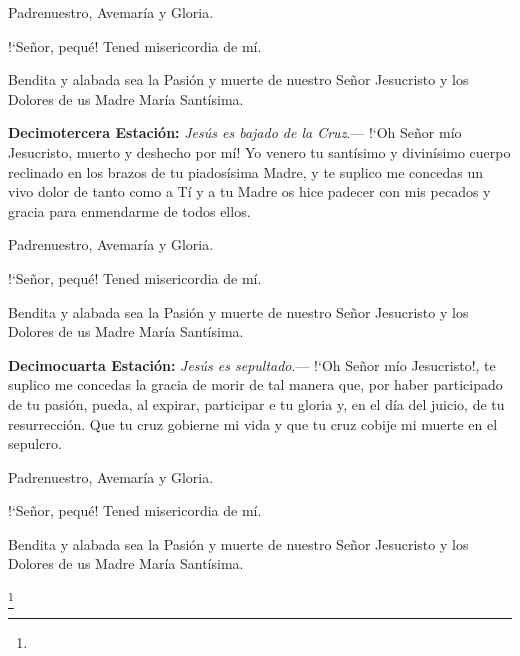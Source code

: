 \vspace{2mm}

Padrenuestro, Avemaría y Gloria.

{!`}Señor, pequé! Tened misericordia de mí.

Bendita y alabada sea la Pasión y muerte de nuestro Señor Jesucristo y los Dolores de us Madre María Santísima.

\vspace{2mm}

\textbf{Decimotercera Estación:} \textit{Jesús es bajado de la Cruz}.--- {!`}Oh Señor mío Jesucristo, muerto y deshecho por mí! Yo venero tu santísimo y divinísimo cuerpo reclinado en
los brazos de tu piadosísima Madre, y te suplico me concedas un vivo dolor de tanto como a Tí y a tu Madre os hice padecer con mis pecados y gracia para enmendarme de todos ellos.

\vspace{2mm}

Padrenuestro, Avemaría y Gloria.

{!`}Señor, pequé! Tened misericordia de mí.

Bendita y alabada sea la Pasión y muerte de nuestro Señor Jesucristo y los Dolores de us Madre María Santísima.

\vspace{2mm}

\textbf{Decimocuarta Estación:} \textit{Jesús es sepultado}.--- {!`}Oh Señor mío Jesucristo!, te suplico me concedas la gracia de morir de tal manera que, por haber participado de tu pasión,
pueda, al expirar, participar e tu gloria y, en el día del juicio, de tu resurrección. Que tu cruz gobierne mi vida y que tu cruz cobije mi muerte en el sepulcro.

\vspace{2mm}

Padrenuestro, Avemaría y Gloria.

{!`}Señor, pequé! Tened misericordia de mí.

Bendita y alabada sea la Pasión y muerte de nuestro Señor Jesucristo y los Dolores de us Madre María Santísima.

\vspace{2mm}

\footnote{}